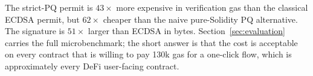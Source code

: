 The strict-PQ permit is $43\times$ more expensive in verification gas than
the classical ECDSA permit, but $62\times$ cheaper than the naive
pure-Solidity PQ alternative. The signature is $51\times$ larger than ECDSA
in bytes. Section~\ref{sec:evaluation} carries the full microbenchmark; the
short answer is that the cost is acceptable on every contract that is
willing to pay 130k gas for a one-click flow, which is approximately every
DeFi user-facing contract.
